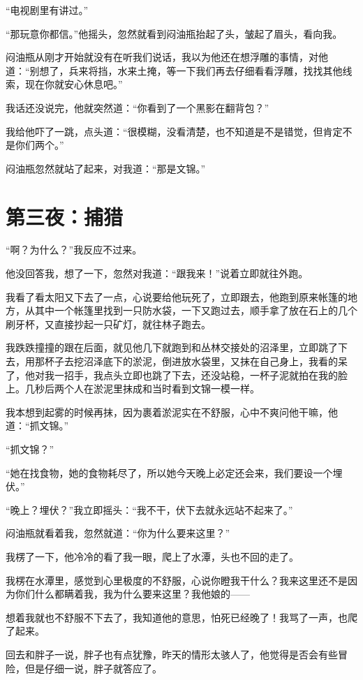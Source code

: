 “电视剧里有讲过。”

“那玩意你都信。”他摇头，忽然就看到闷油瓶抬起了头，皱起了眉头，看向我。

闷油瓶从刚才开始就没有在听我们说话，我以为他还在想浮雕的事情，对他道：“别想了，兵来将挡，水来土掩，等一下我们再去仔细看看浮雕，找找其他线索，现在你就安心休息吧。”

我话还没说完，他就突然道：“你看到了一个黑影在翻背包？”

我给他吓了一跳，点头道：“很模糊，没看清楚，也不知道是不是错觉，但肯定不是你们两个。”

闷油瓶忽然就站了起来，对我道：“那是文锦。”

\chapter{第三夜：捕猎}

“啊？为什么？”我反应不过来。

他没回答我，想了一下，忽然对我道：“跟我来！”说着立即就往外跑。

我看了看太阳又下去了一点，心说要给他玩死了，立即跟去，他跑到原来帐篷的地方，从其中一个帐篷里找到一只防水袋，一下又跑过去，顺手拿了放在石上的几个刷牙杯，又直接抄起一只矿灯，就往林子跑去。

我跌跌撞撞的跟在后面，就见他几下就跑到和丛林交接处的沼泽里，立即跳了下去，用那杯子去挖沼泽底下的淤泥，倒进放水袋里，又抹在自己身上，我看的呆了，他对我一招手，我点头立即也跳了下去，还没站稳，一杯子泥就拍在我的脸上。几秒后两个人在淤泥里抹成和当时看到文锦一模一样。

我本想到起雾的时候再抹，因为裹着淤泥实在不舒服，心中不爽问他干嘛，他道：“抓文锦。”

“抓文锦？”

“她在找食物，她的食物耗尽了，所以她今天晚上必定还会来，我们要设一个埋伏。”

“晚上？埋伏？”我立即摇头：“我不干，伏下去就永远站不起来了。”

闷油瓶就看着我，忽然就道：“你为什么要来这里？”

我楞了一下，他冷冷的看了我一眼，爬上了水潭，头也不回的走了。

我楞在水潭里，感觉到心里极度的不舒服，心说你瞪我干什么？我来这里还不是因为你们什么都瞒着我，我为什么要来这里？我他娘的——

想着我就也不舒服不下去了，我知道他的意思，怕死已经晚了！我骂了一声，也爬了起来。

回去和胖子一说，胖子也有点犹豫，昨天的情形太骇人了，他觉得是否会有些冒险，但是仔细一说，胖子就答应了。

